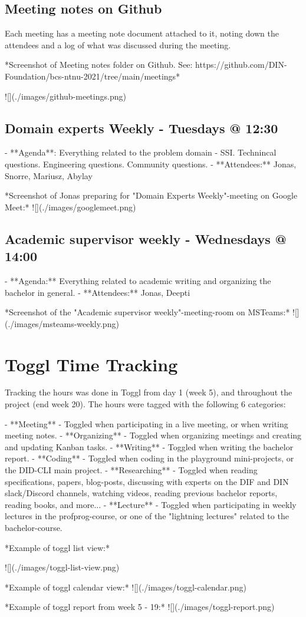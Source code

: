 \subsection{Meeting notes on Github}

Each meeting has a meeting note document attached to it, noting down the attendees
and a log of what was discussed during the meeting.

*Screenshot of Meeting notes folder on Github. See: https://github.com/DIN-Foundation/bcs-ntnu-2021/tree/main/meetings*

![](./images/github-meetings.png)


\subsection{Domain experts Weekly - Tuesdays @ 12:30}

- **Agenda**: Everything related to the problem domain - SSI. Technincal questions. Engineering questions. Community questions.
- **Attendees:** Jonas, Snorre, Mariusz, Abylay

*Screenshot of Jonas preparing for "Domain Experts Weekly"-meeting on Google Meet:*
	![](./images/googlemeet.png)

\subsection{Academic supervisor weekly - Wednesdays @ 14:00}

- **Agenda:** Everything related to academic writing and organizing the bachelor in general.
 - **Attendees:** Jonas, Deepti

*Screenshot of the "Academic supervisor weekly"-meeting-room on MSTeams:*
	![](./images/msteams-weekly.png)





\section{Toggl Time Tracking}

Tracking the hours was done in Toggl from day 1 (week 5), and throughout the project (end week 20). The hours were tagged with the following 6 categories:

- **Meeting** - Toggled when participating in a live meeting, or when writing meeting notes.
- **Organizing** - Toggled when organizing meetings and creating and updating Kanban tasks.
- **Writing** - Toggled when writing the  bachelor report.
- **Coding** - Toggled when coding in the playground mini-projects, or the DID-CLI main project.
- **Researching** - Toggled when reading specifications, papers, blog-posts, discussing with experts on the DIF and DIN slack/Discord channels, watching videos, reading previous bachelor reports, reading books, and more...
- **Lecture** - Toggled when participating in weekly lectures in the profprog-course, or one of the "lightning lectures" related to the bachelor-course.



*Example of toggl list view:*

![](./images/toggl-list-view.png)

*Example of toggl calendar view:*
![](./images/toggl-calendar.png)

*Example of toggl report from week 5 - 19:*
![](./images/toggl-report.png)
